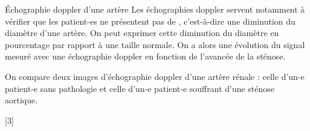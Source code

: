 \begin{doc}{Échographie doppler d'une artère}
  Les échographies doppler servent notamment à vérifier que les patient-es ne présentent pas de , c'est-à-dire une diminution du diamètre d'une artère.
  On peut exprimer cette diminution du diamètre en pourcentage par rapport à une taille normale.
  On a alors une évolution du signal mesuré avec une échographie doppler en fonction de l'avancée de la sténose.
  \begin{center}
    
  \end{center}

  On compare deux images d'échographie doppler d'une artère rénale : celle d'un-e patient-e sans pathologie et celle d'un-e patient-e souffrant d'une sténose aortique.
  
  \begin{center}
    
  \end{center}
\end{doc}


[3]